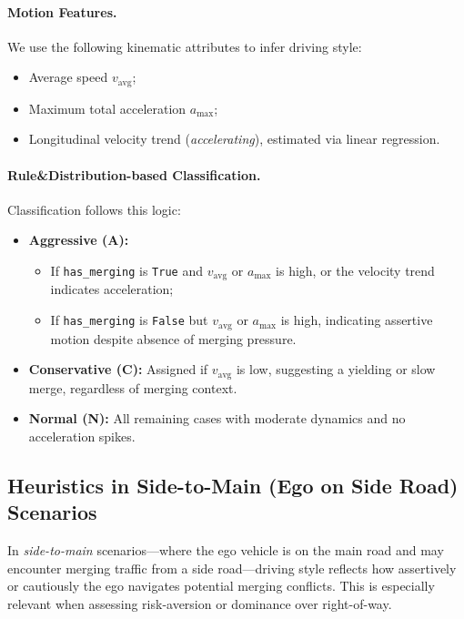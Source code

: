 \documentclass{article}
\begin{document}
\paragraph{Motion Features.}
We use the following kinematic attributes to infer driving style:
\begin{itemize}[leftmargin=1em, topsep=0pt, itemsep=0.3em]
    \item Average speed $v_{\text{avg}}$;
    \item Maximum total acceleration $a_{\max}$;
    \item Longitudinal velocity trend (\textit{accelerating}), estimated via linear regression.
\end{itemize}

\paragraph{Rule\&Distribution-based Classification.}
Classification follows this logic:
\begin{itemize}[leftmargin=1em, topsep=0pt, itemsep=0.3em]
    \item \textbf{Aggressive (A):}
    \begin{itemize}
        \item If \texttt{has\_merging} is \texttt{True} and $v_{\text{avg}}$ or $a_{\max}$ is high, or the velocity trend indicates acceleration;
        \item If \texttt{has\_merging} is \texttt{False} but $v_{\text{avg}}$ or $a_{\max}$ is high, indicating assertive motion despite absence of merging pressure.
    \end{itemize}
    
    \item \textbf{Conservative (C):} Assigned if $v_{\text{avg}}$ is low, suggesting a yielding or slow merge, regardless of merging context.

    \item \textbf{Normal (N):} All remaining cases with moderate dynamics and no acceleration spikes.
\end{itemize}



\subsection{Heuristics in Side-to-Main (Ego on Side Road) Scenarios}

In \textit{side-to-main} scenarios—where the ego vehicle is on the main road and may encounter merging traffic from a side road—driving style reflects how assertively or cautiously the ego navigates potential merging conflicts. This is especially relevant when assessing risk-aversion or dominance over right-of-way.
\end{document}
